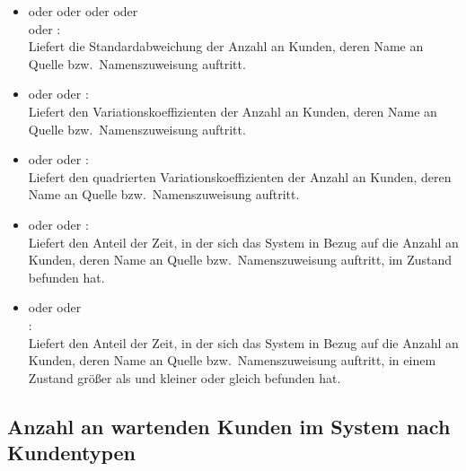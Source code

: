 \begin{itemize}
\item
{} oder  oder  oder  oder\\
 oder :\\
Liefert die Standardabweichung der Anzahl an Kunden, deren Name an Quelle bzw.\ Namenszuweisung  auftritt.

\item
{} oder  oder :\\
Liefert den Variationskoeffizienten der Anzahl an Kunden, deren Name an Quelle bzw.\ Namenszuweisung  auftritt.

\item
{} oder  oder :\\
Liefert den quadrierten Variationskoeffizienten der Anzahl an Kunden, deren Name an Quelle bzw.\ Namenszuweisung  auftritt.

\item
{} oder  oder :\\
Liefert den Anteil der Zeit, in der sich das System in Bezug auf die Anzahl an Kunden, deren Name an Quelle bzw.\ Namenszuweisung  auftritt, im Zustand  befunden hat.

\item
{} oder  oder\\
:\\
Liefert den Anteil der Zeit, in der sich das System in Bezug auf die Anzahl an Kunden, deren Name an Quelle bzw.\ Namenszuweisung  auftritt, in einem Zustand größer als  und kleiner oder gleich  befunden hat.

\end{itemize}



\subsection{Anzahl an wartenden Kunden im System nach Kundentypen}

